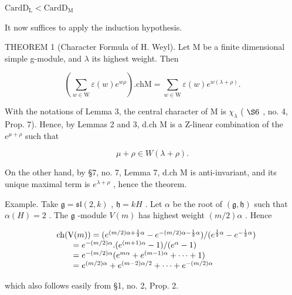 \(\mathrm{CardD_L} <   \mathrm{CardD_M}\)

It now suffices to apply the induction hypothesis.

THEOREM 1 (Character Formula of H. Weyl). Let M be a finite dimensional simple g-module, and \(\lambda\) its highest weight. Then

\[
\left(\sum_ {w \in \mathrm{W}} \varepsilon (w) e ^ {w \rho}\right). \mathrm{chM} = \sum_ {w \in \mathrm{W}} \varepsilon (w) e ^ {w (\lambda + \rho)}.
\]

With the notations of Lemma 3, the central character of M is \(\chi_{\lambda}\) ( \(\S6\) , no. 4, Prop. 7). Hence, by Lemmas 2 and 3, d.ch M is a Z-linear combination of the \(e^{\mu+\rho}\) such that

\[
\mu + \rho \in W (\lambda + \rho).
\]

On the other hand, by §7, no. 7, Lemma 7, d.ch M is anti-invariant, and its unique maximal term is \(e^{\lambda+\rho}\) , hence the theorem.

Example. Take \(\mathfrak{g} = \mathfrak{sl}(2,k)\) , \(\mathfrak{h} = kH\) . Let \(\alpha\) be the root of \((\mathfrak{g},\mathfrak{h})\) such that \(\alpha (H) = 2\) . The \(\mathfrak{g}\) -module \(V(m)\) has highest weight \((m / 2)\alpha\) . Hence

\[
\begin{array}{r l} & {\mathrm{ch} (\mathrm{V} (m)) = (e ^ {(m / 2) \alpha + \frac {1}{2} \alpha} - e ^ {- (m / 2) \alpha - \frac {1}{2} \alpha}) / (e ^ {\frac {1}{2} \alpha} - e ^ {- \frac {1}{2} \alpha})} \\ & {\qquad = e ^ {- (m / 2) \alpha}. (e ^ {(m + 1) \alpha} - 1) / (e ^ {\alpha} - 1)} \\ & {\qquad = e ^ {- (m / 2) \alpha} (e ^ {m \alpha} + e ^ {(m - 1) \alpha} + \dots + 1)} \\ & {\qquad = e ^ {(m / 2) \alpha} + e ^ {(m - 2) \alpha / 2} + \dots + e ^ {- (m / 2) \alpha}} \end{array}
\]

which also follows easily from §1, no. 2, Prop. 2.

